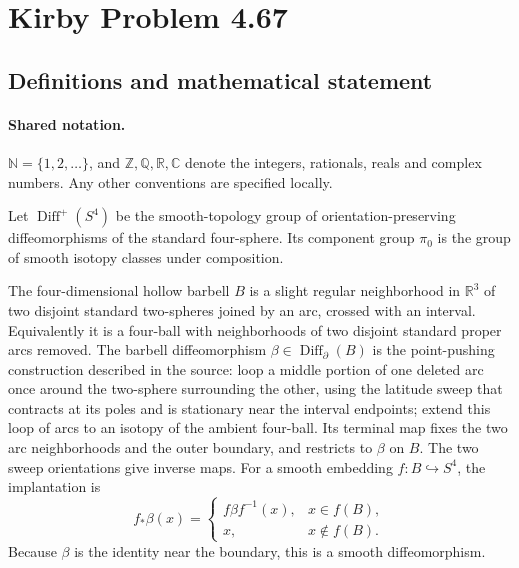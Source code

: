\documentclass[11pt]{article}
\begin{document}
\section{Kirby Problem 4.67}\label{statement}

\subsection{Definitions and mathematical statement}

\paragraph{Shared notation.}$\mathbb N=\{1,2,\ldots\}$, and $\mathbb Z,\mathbb Q,\mathbb R,\mathbb C$ denote the integers, rationals, reals and complex numbers. Any other conventions are specified locally.


Let $\operatorname{Diff}^+(S^4)$ be the smooth-topology group of orientation-preserving diffeomorphisms of the standard four-sphere. Its component group $\pi_0$ is the group of smooth isotopy classes under composition.

The four-dimensional hollow barbell $B$ is a slight regular neighborhood in $\mathbb R^3$ of two disjoint standard two-spheres joined by an arc, crossed with an interval. Equivalently it is a four-ball with neighborhoods of two disjoint standard proper arcs removed. The barbell diffeomorphism $\beta\in\operatorname{Diff}_{\partial}(B)$ is the point-pushing construction described in the source: loop a middle portion of one deleted arc once around the two-sphere surrounding the other, using the latitude sweep that contracts at its poles and is stationary near the interval endpoints; extend this loop of arcs to an isotopy of the ambient four-ball. Its terminal map fixes the two arc neighborhoods and the outer boundary, and restricts to $\beta$ on $B$. The two sweep orientations give inverse maps. For a smooth embedding $f:B\hookrightarrow S^4$, the implantation is
\[
f_*\beta(x)=
\begin{cases}
f\beta f^{-1}(x),&x\in f(B),\\
x,&x\notin f(B).
\end{cases}
\]
Because $\beta$ is the identity near the boundary, this is a smooth diffeomorphism.
\end{document}

